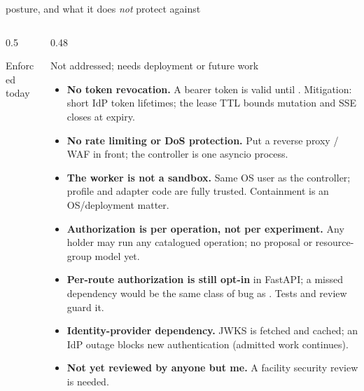 \begin{frame}{\vtwo{} posture, and what it does \emph{not} protect against}
\begin{columns}[T]
\begin{column}{0.5\textwidth}
\begin{block}{Enforced today}
            \end{block}
        \end{column}
        \begin{column}{0.48\textwidth}
            \begin{alertblock}{Not addressed; needs deployment or future work}
                \scriptsize
                \begin{itemize}
                    \item \textbf{No token revocation.} A bearer token is valid until . Mitigation:
                          short IdP token lifetimes; the lease TTL bounds mutation and SSE closes at expiry.
                    \item \textbf{No rate limiting or DoS protection.} Put a reverse proxy / WAF in front;
                          the controller is one asyncio process.
                    \item \textbf{The worker is not a sandbox.} Same OS user as the controller; profile and
                          adapter code are fully trusted. Containment is an OS/deployment matter.
                    \item \textbf{Authorization is per operation, not per experiment.} Any 
                          holder may run any catalogued operation; no proposal or resource-group model yet.
                    \item \textbf{Per-route authorization is still opt-in} in FastAPI; a missed dependency
                          would be the same class of bug as . Tests and review guard it.
                    \item \textbf{Identity-provider dependency.} JWKS is fetched and cached; an IdP outage blocks
                          new authentication (admitted work continues).
                    \item \textbf{Not yet reviewed by anyone but me.} A facility security review is needed.
                \end{itemize}
            \end{alertblock}
        \end{column}
    \end{columns}
\end{frame}

